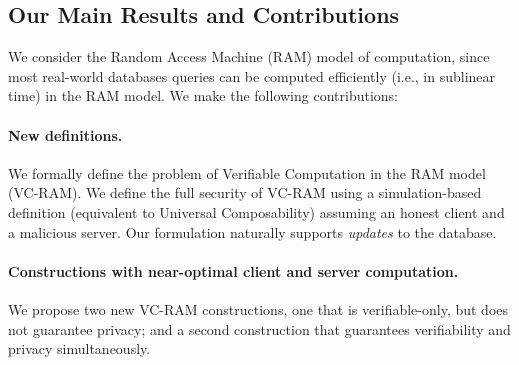 \subsection{Our Main Results and Contributions}
We consider the Random Access Machine (RAM) model of computation, since most real-world databases queries 
can be computed efficiently (i.e., in sublinear time) in the RAM model.
We make the following contributions:

\paragraph{New definitions.}
We formally define the problem of Verifiable Computation
in the RAM model (VC-RAM). We define the full security of VC-RAM using
a simulation-based definition (equivalent to
Universal Composability) assuming an
honest client and a malicious
server.
Our formulation naturally supports {\it updates} to the database.


\paragraph{Constructions with near-optimal
client and server computation.}
We propose two new VC-RAM constructions,
one that is verifiable-only, but does not guarantee privacy;
and a second construction that guarantees verifiability and privacy
simultaneously.


